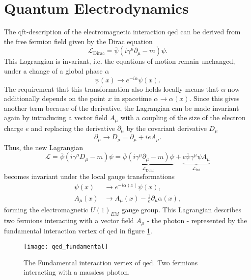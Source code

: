 \section{Quantum Electrodynamics}\label{sec:qed}
The \ac{qft}-description of the electromagnetic interaction \ac{qed} can be derived from the free fermion field given by the Dirac equation
\begin{equation}
    \mathcal{L}_\mathrm{Dirac} = \overline{\psi}(i \gamma^\mu \partial_\mu - m )\psi.
    \label{eq:dirac}
\end{equation}
This Lagrangian is invariant, i.e. the equations of motion remain unchanged, under a change of a global phase $\alpha$
\begin{equation}
    \psi(x) \rightarrow  e^{-i \alpha}\psi(x).
\end{equation}
The requirement that this transformation also holds locally means that $\alpha$ now additionally depends on the point $x$ in spacetime $\alpha \rightarrow \alpha(x)$. Since this gives another term because of the derivative, the Lagrangian can be made invariant again by introducing a vector field $A_\mu$ with a coupling of the size of the electron charge $e$ and replacing the derivative $\partial_\mu$ by the covariant derivative $D_\mu$
\begin{equation}
    \partial_\mu \rightarrow D_\mu = \partial_\mu + ie A_\mu.
    \label{eq:cov_diff}
\end{equation}
Thus, the new Lagrangian
\begin{equation}
    \mathcal{L} = \overline{\psi}(i \gamma^\mu D_\mu - m )\psi
    =
    \underbrace{\overline{\psi}(i \gamma^\mu \partial_\mu - m )\psi}_{\mathcal{L}_\mathrm{Dirac} }
    +
    \underbrace{ e\overline{\psi} \gamma^\mu {\psi}A_\mu}_{\mathcal{L}_\mathrm{int}}
\end{equation}
becomes invariant under the local gauge transformations
\begin{align}
    \psi(x)  & \rightarrow  e^{-i \alpha(x)}\psi(x),                      \\
    A_\mu(x) & \xrightarrow{} A_\mu(x) -\frac{1}{e}\partial_\mu\alpha(x),
\end{align}
forming the electromagnetic $U(1)_{EM}$ gauge group.
This Lagrangian describes two fermions interacting with a vector field $A_\mu$ - the photon - represented by the fundamental interaction vertex of \ac{qed} in figure \ref{fig:qed_fundamental}.
\begin{figure}
    \centering
    \texttt{[image: qed\_fundamental]}
    \caption[]{The Fundamental interaction vertex of \ac{qed}. Two fermions interacting with a massless photon.}
    \label{fig:qed_fundamental}
\end{figure}
